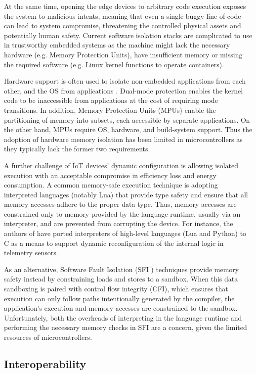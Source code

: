 At the same time, opening the edge devices to arbitrary code execution exposes the system to malicious intents, meaning that even a single buggy line of code can lead to system compromise, threatening the controlled physical assets and potentially human safety. Current software isolation stacks are complicated to use in trustworthy embedded systems as the machine might lack the necessary hardware (e.g. Memory Protection Units), have insufficient memory or missing the required software (e.g. Linux kernel functions to operate containers). 

Hardware support is often used to isolate non-embedded applications from each other, and the OS from applications \cite{ewasm}. Dual-mode protection enables the kernel code to be inaccessible from applications at the cost of requiring mode transitions. In addition, Memory Protection Units (MPUs) enable the partitioning of memory into subsets, each accessible by separate applications. 
On the other hand, MPUs require OS, hardware, and build-system support. Thus the adoption of hardware memory isolation has been limited in microcontrollers as they typically lack the former two requirements.

A further challenge of IoT devices' dynamic configuration is allowing isolated execution with an acceptable compromise in efficiency loss and energy consumption. A common memory-safe execution technique is adopting interpreted languages (notably Lua) that provide type safety and ensure that all memory accesses adhere to the proper data type. Thus, memory accesses are constrained only to memory provided by the language runtime, usually via an interpreter, and are prevented from corrupting the device. For instance, the authors of \cite{levee} have ported interpreters of high-level languages (Lua and Python) to C as a means to support dynamic reconfiguration of the internal logic in telemetry sensors.

As an alternative, Software Fault Isolation (SFI \cite{sfi}) techniques provide memory safety instead by constraining loads and stores to a sandbox. When this data sandboxing is paired with control flow integrity (CFI), which ensures that execution can only follow paths intentionally generated by the compiler, the application's execution and memory accesses are constrained to the sandbox. Unfortunately, both the overheads of interpreting in the language runtime and performing the necessary memory checks in SFI are a concern, given the limited resources of microcontrollers.

\subsection{Interoperability}
\label{sec:interoperability}


